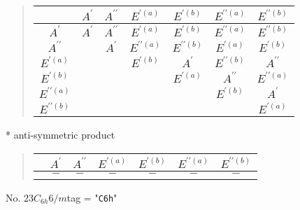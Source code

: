 \documentclass[fleqn,10pt,landscape]{jsarticle}
\begin{document}
\begin{quote}
\begin{tabular}{c|cccccc} \hline \hline
 & $ A^{\prime} $ & $ A^{\prime\prime} $ & $ E^{\prime(a)} $ & $ E^{\prime(b)} $ & $ E^{\prime\prime(a)} $ & $ E^{\prime\prime(b)} $ \\ \hline
$ A^{\prime} $ & $ A^{\prime} $ & $ A^{\prime\prime} $ & $ E^{\prime(a)} $ & $ E^{\prime(b)} $ & $ E^{\prime\prime(a)} $ & $ E^{\prime\prime(b)} $ \\
$ A^{\prime\prime} $ & $  $ & $ A^{\prime} $ & $ E^{\prime\prime(a)} $ & $ E^{\prime\prime(b)} $ & $ E^{\prime(a)} $ & $ E^{\prime(b)} $ \\
$ E^{\prime(a)} $ & $  $ & $  $ & $ E^{\prime(b)} $ & $ A^{\prime} $ & $ E^{\prime\prime(b)} $ & $ A^{\prime\prime} $ \\
$ E^{\prime(b)} $ & $  $ & $  $ & $  $ & $ E^{\prime(a)} $ & $ A^{\prime\prime} $ & $ E^{\prime\prime(a)} $ \\
$ E^{\prime\prime(a)} $ & $  $ & $  $ & $  $ & $  $ & $ E^{\prime(b)} $ & $ A^{\prime} $ \\
$ E^{\prime\prime(b)} $ & $  $ & $  $ & $  $ & $  $ & $  $ & $ E^{\prime(a)} $ \\
 \hline \hline
\end{tabular}
\end{quote}
* anti-symmetric product
\begin{quote}
\begin{tabular}{ccccccc} \hline \hline
 & $ A^{\prime} $ & $ A^{\prime\prime} $ & $ E^{\prime(a)} $ & $ E^{\prime(b)} $ & $ E^{\prime\prime(a)} $ & $ E^{\prime\prime(b)} $ \\ \hline
$  $ & $ - $ & $ - $ & $ - $ & $ - $ & $ - $ & $ - $ \\
 \hline \hline
\end{tabular}
\end{quote}
\newpage
No. 23\quad$C_{6h}$\quad$6/m$\quad[ hexagonal ]
tag = "{\tt C6h}"
\end{document}
